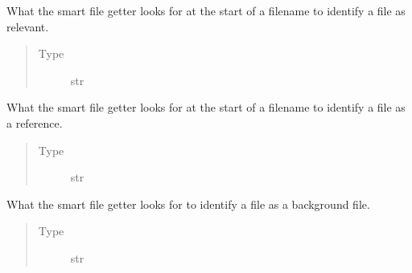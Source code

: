 \documentclass[a4paper,10pt,english]{sphinxmanual}
\begin{document}
\begin{fulllineitems}
\begin{fulllineitems}
\begin{quote}
\begin{description}
\end{description}\end{quote}

\end{fulllineitems}


\begin{fulllineitems}
\label{\detokenize{sfgtools:sfgtools.SFGProcessTools.samplestring}}
\sphinxAtStartPar
What the smart file getter looks for at the start of a filename to identify a file as relevant.
\begin{quote}\begin{description}
\item[{Type}] \leavevmode
\sphinxAtStartPar
str

\end{description}\end{quote}

\end{fulllineitems}


\begin{fulllineitems}
\label{\detokenize{sfgtools:sfgtools.SFGProcessTools.refstring}}
\sphinxAtStartPar
What the smart file getter looks for at the start of a filename to identify a file as a reference.
\begin{quote}\begin{description}
\item[{Type}] \leavevmode
\sphinxAtStartPar
str

\end{description}\end{quote}

\end{fulllineitems}


\begin{fulllineitems}
\label{\detokenize{sfgtools:sfgtools.SFGProcessTools.bg_string}}
\sphinxAtStartPar
What the smart file getter looks for to identify a file as a background file.
\begin{quote}\begin{description}
\item[{Type}] \leavevmode
\sphinxAtStartPar
str


\end{description}
\end{quote}
\end{fulllineitems}
\end{fulllineitems}
\end{document}
